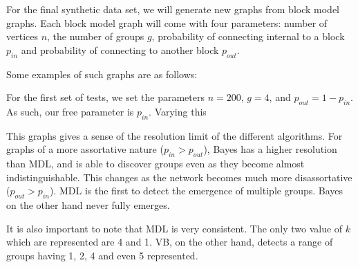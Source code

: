 For the final synthetic data set, we will generate new graphs from block
model graphs. Each block model graph will come with four parameters:
number of vertices $n$, the number of groups $g$, probability of
connecting internal to a block $p_{in}$ and probability of connecting to
another block $p_{out}$.

Some examples of such graphs are as follows:




For the first set of tests, we set the parameters $n=200$, $g=4$, and
$p_{out} = 1-p_{in}$. As such, our free parameter is $p_{in}$. Varying this



This graphs gives a sense of the resolution limit of the different
algorithms. For graphs of a more assortative nature ($p_{in} > p_{out}$),
Bayes has a higher resolution than MDL, and is able to discover groups
even as they become almost indistinguishable. This changes as the network
becomes much more disassortative ($p_{out} > p_{in}$). MDL is the first
to detect the emergence of multiple groups. Bayes on the other hand never
fully emerges.

It is also important to note that MDL is very consistent. The only two
value of $k$ which are represented are 4 and 1. VB, on the other hand,
detects a range of groups having 1, 2, 4 and even 5 represented.


